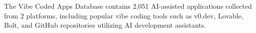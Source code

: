 The Vibe Coded Apps Database \cite{vibecodedapps2025} contains 2,051 AI-assisted applications collected from 2 platforms, including popular vibe coding tools such as v0.dev, Lovable, Bolt, and GitHub repositories utilizing AI development assistants.